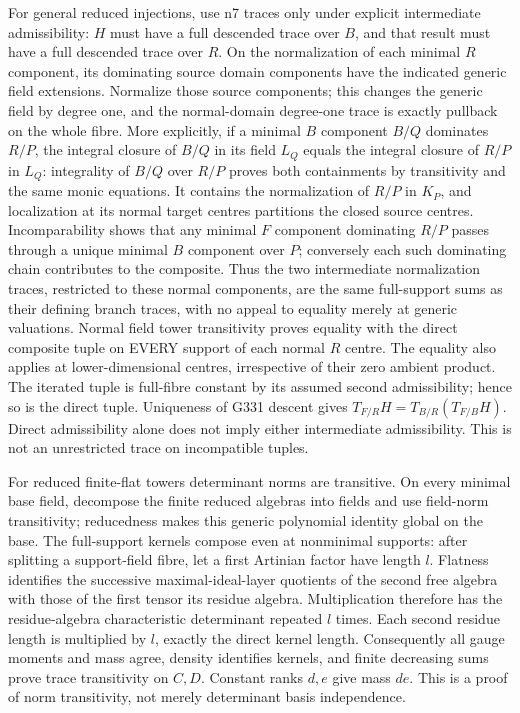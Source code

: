 \documentclass[11pt]{article}
\begin{document}
For general reduced injections, use n7 traces only under explicit intermediate admissibility: $H$ must have a full descended trace over $B$, and that result must have a full descended trace over $R$. On the normalization of each minimal $R$ component, its dominating source domain components have the indicated generic field extensions. Normalize those source components; this changes the generic field by degree one, and the normal-domain degree-one trace is exactly pullback on the whole fibre. More explicitly, if a minimal $B$ component $B/Q$ dominates $R/P$, the integral closure of $B/Q$ in its field $L_Q$ equals the integral closure of $R/P$ in $L_Q$: integrality of $B/Q$ over $R/P$ proves both containments by transitivity and the same monic equations. It contains the normalization of $R/P$ in $K_P$, and localization at its normal target centres partitions the closed source centres. Incomparability shows that any minimal $F$ component dominating $R/P$ passes through a unique minimal $B$ component over $P$; conversely each such dominating chain contributes to the composite. Thus the two intermediate normalization traces, restricted to these normal components, are the same full-support sums as their defining branch traces, with no appeal to equality merely at generic valuations. Normal field tower transitivity proves equality with the direct composite tuple on EVERY support of each normal $R$ centre. The equality also applies at lower-dimensional centres, irrespective of their zero ambient product. The iterated tuple is full-fibre constant by its assumed second admissibility; hence so is the direct tuple. Uniqueness of G331 descent gives $T_{F/R}H=T_{B/R}(T_{F/B}H)$. Direct admissibility alone does not imply either intermediate admissibility. This is not an unrestricted trace on incompatible tuples.

For reduced finite-flat towers determinant norms are transitive. On every minimal base field, decompose the finite reduced algebras into fields and use field-norm transitivity; reducedness makes this generic polynomial identity global on the base. The full-support kernels compose even at nonminimal supports: after splitting a support-field fibre, let a first Artinian factor have length $l$. Flatness identifies the successive maximal-ideal-layer quotients of the second free algebra with those of the first tensor its residue algebra. Multiplication therefore has the residue-algebra characteristic determinant repeated $l$ times. Each second residue length is multiplied by $l$, exactly the direct kernel length. Consequently all gauge moments and mass agree, density identifies kernels, and finite decreasing sums prove trace transitivity on $C,D$. Constant ranks $d,e$ give mass $de$. This is a proof of norm transitivity, not merely determinant basis independence.
\end{document}
